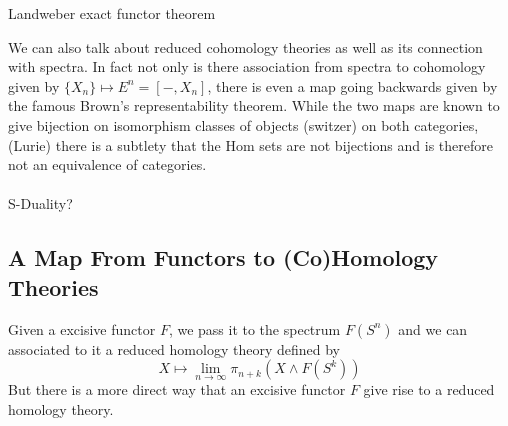 \documentclass[a4paper]{article}
\begin{document}
\begin{thm}{Landweber exact functor theorem}{}
\end{thm}

We can also talk about reduced cohomology theories as well as its connection with spectra. In fact not only is there association from spectra to cohomology given by $\{X_n\}\mapsto E^n=[-,X_n]$, there is even a map going backwards given by the famous Brown's representability theorem. While the two maps are known to give bijection on isomorphism classes of objects (switzer) on both categories, (Lurie) there is a subtlety that the Hom sets are not bijections and is therefore not an equivalence of categories. \\~\\

S-Duality?

\subsection{A Map From Functors to (Co)Homology Theories}
Given a excisive functor $F$, we pass it to the spectrum $F(S^n)$ and we can associated to it a reduced homology theory defined by $$X\mapsto\lim_{n\to\infty}\pi_{n+k}(X\wedge F(S^k))$$ But there is a more direct way that an excisive functor $F$ give rise to a reduced homology theory. 
\end{document}
